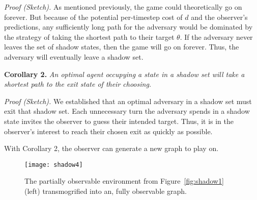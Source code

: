 \textit{Proof (Sketch).} As mentioned previously, the game could theoretically go on forever. But because of the potential per-timestep cost of $d$ and the observer's predictions, any sufficiently long path for
the adversary would be dominated by the strategy of taking the shortest path to their target $\theta$. If the adversary never leaves the set of shadow states, then the game will go on forever. Thus, the adversary will eventually leave a shadow set. 

\textbf{Corollary 2.} \textit{An optimal agent occupying a state in a shadow set will take a shortest path to the exit state of their choosing.} 

\textit{Proof (Sketch).} We established that an optimal adversary in a shadow set must exit that shadow set. Each unnecessary turn the adversary spends in a shadow state invites the observer to guess their intended target. Thus, it is in the observer's interest to reach their chosen exit as quickly as possible.

With Corollary 2, the observer can generate a new graph to play on.

\begin{figure}[h!]
\begin{center}

  \texttt{[image: shadow4]}
  \end{center}

  \caption{The partially observable environment from Figure~\ref{fig:shadow1} (left) transmogrified into an, fully observable graph.}
  
  \label{fig:shadow4}
\end{figure}

